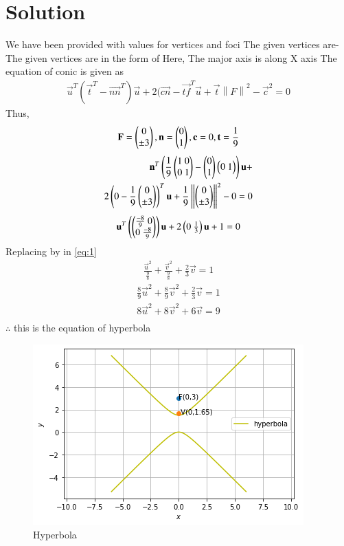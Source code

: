 \documentclass[journal,12pt,twocolumn]{IEEEtran}
\newcommand{\norm}[1]{\left\lVert#1\right\rVert}
\begin{document}
\section{Solution}
We have been provided with values for vertices and foci
\newline
The given vertices are- 
\newline
The given vertices are in the form of 
Here, The major axis is along X axis
\newline
The equation of conic is given as 
\begin{align}
\vec{u}^T(\vec{t}^T-\vec{nn}^T) \vec{u}+2(\vec{cn}-\vec{tf}^T\vec{u}+\vec{t}\norm{F}^2-\vec{c}^2=0
\end{align}
Thus,
\begin{align}
\mathbf{F}=\begin{pmatrix}0\\\pm 3\end{pmatrix}, \mathbf{n}= \begin{pmatrix}0\\1\end{pmatrix},\mathbf{c}=0, \mathbf{t}=\frac{1}{9}
\end{align}
\begin{align}\label{eq:1}
\vec{n}^T\brak{\frac{1}{9}\myvec{1\ 0\\ 0\ 1}-\myvec{0\\1}\myvec{0\ 1}}\vec{u}+\\
2\brak{0-\frac{1}{9}\myvec{0\\\pm3}}^T\vec{u}+\frac{1}{9}\norm{\myvec{0\\\pm3}}^2-0=0
\end{align}
\begin{align}
\vec{u}^T\brak{\myvec{\frac{-8}{9}\ 0 \\ 0\ \frac{-8}{9}}}\vec{u}+2\myvec{0 \ \frac{1}{3}}\vec{u}+1=0
\end{align}
Replacing  by  in \eqref{eq:1}
\begin{align}
\frac{\vec{u}^2}{\frac{9}{8}}+\frac{\vec{v}^2}{\frac{9}{8}}+\frac{2}{3}\vec{v}=1
\end{align}
\begin{align}
\frac{8}{9}\vec{u}^2+\frac{8}{9}\vec{v}^2+\frac{2}{3}\vec{v}=1
\end{align}
\begin{align}
 8\vec{u}^2+8\vec{v}^2+6\vec{v}=9\\
\end{align}
$\therefore$ this is the equation of hyperbola 
\begin{figure}[ht]
\centering
\includegraphics[width=\columnwidth]{download.png}
\caption{Hyperbola}
\label{Hyperbola along given axis}
\end{figure}
\end{document}
